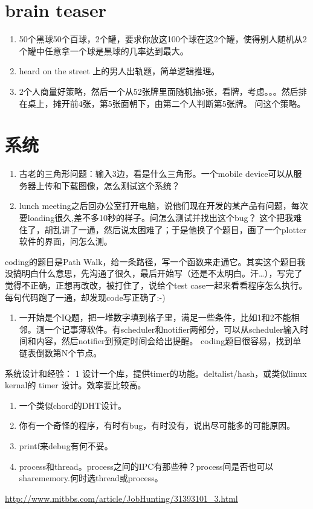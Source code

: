 \documentclass[12pt]{book}
\begin{document}
\chapter{brain teaser}
\label{sec-9}
\begin{enumerate}
\item 50个黑球50个百球，2个罐，要求你放这100个球在这2个罐，使得别人随机从2个罐中任意拿一个球是黑球的几率达到最大。

\item heard on the street 上的男人出轨题，简单逻辑推理。

\item 2个人商量好策略，然后一个从52张牌里面随机抽5张，看牌，考虑。。。然后排在桌上，摊开前4张，第5张面朝下，由第二个人判断第5张牌。 问这个策略。
\end{enumerate}

\chapter{系统}
\label{sec-10}
\begin{enumerate}
\item 古老的三角形问题：输入3边，看是什么三角形。一个mobile device可以从服务器上传和下载图像，怎么测试这个系统？

\item lunch meeting之后回办公室打开电脑，说他们现在开发的某产品有问题，每次要loading很久,差不多10秒的样子。问怎么测试并找出这个bug？ 这个把我难住了，胡乱讲了一通，然后说太困难了；于是他换了个题目，画了一个plotter软件的界面，问怎么测。
\end{enumerate}
coding的题目是Path Walk，给一条路径，写一个函数来走通它。其实这个题目我没搞明白什么意思，先沟通了很久，最后开始写（还是不太明白。汗\ldots{}），写完了觉得不正确，正想再改改，被打住了，说给个test case一起来看看程序怎么执行。每句代码跑了一通，却发现code写正确了:-) 

\begin{enumerate}
\item 一开始是个IQ题，把一堆数字填到格子里，满足一些条件，比如1和2不能相邻。测一个记事薄软件。有scheduler和notifier两部分，可以从scheduler输入时间和内容，然后notifier到预定时间会给出提醒。 coding题目很容易，找到单链表倒数第N个节点。
\end{enumerate}

系统设计和经验：
1 设计一个库，提供timer的功能。deltalist/hash，或类似linux kernal的 timer 设计。效率要比较高。
\begin{enumerate}
\item 一个类似chord的DHT设计。
\item 你有一个奇怪的程序，有时有bug，有时没有，说出尽可能多的可能原因。
\item printf来debug有何不妥。
\item process和thread。process之间的IPC有那些种？process间是否也可以sharememory.何时选thread或process。
\end{enumerate}
\url{http://www.mitbbs.com/article/JobHunting/31393101_3.html}
\end{document}
